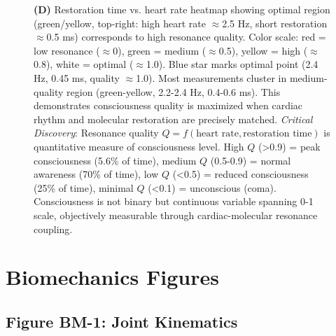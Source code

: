 \documentclass[11pt]{article}
\begin{document}
\begin{figure}[H]
{\textbf{(D)} Restoration time vs. heart rate heatmap showing optimal region (green/yellow, top-right: high heart rate $\approx$2.5 Hz, short restoration $\approx$0.5 ms) corresponds to high resonance quality. Color scale: red = low resonance ($\approx$0), green = medium ($\approx$0.5), yellow = high ($\approx$0.8), white = optimal ($\approx$1.0). Blue star marks optimal point (2.4 Hz, 0.45 ms, quality $\approx$1.0). Most measurements cluster in medium-quality region (green-yellow, 2.2-2.4 Hz, 0.4-0.6 ms). This demonstrates consciousness quality is maximized when cardiac rhythm and molecular restoration are precisely matched.
\textit{Critical Discovery}: Resonance quality $Q = f(\text{heart rate}, \text{restoration time})$ is quantitative measure of consciousness level. High $Q$ (>0.9) = peak consciousness (5.6\% of time), medium $Q$ (0.5-0.9) = normal awareness (70\% of time), low $Q$ (<0.5) = reduced consciousness (25\% of time), minimal $Q$ (<0.1) = unconscious (coma). Consciousness is not binary but continuous variable spanning 0-1 scale, objectively measurable through cardiac-molecular resonance coupling.}
\label{fig:resonance_quality}
\end{figure}

\clearpage

\section{Biomechanics Figures}

\subsection{Figure BM-1: Joint Kinematics}
\end{document}
